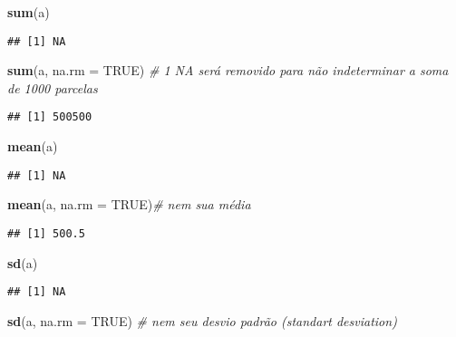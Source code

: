 \documentclass[]{article}
\newenvironment{Shaded}{\begin{snugshade}}{\end{snugshade}}
\newcommand{\KeywordTok}[1]{\textcolor[rgb]{0.13,0.29,0.53}{\textbf{#1}}}
\newcommand{\DataTypeTok}[1]{\textcolor[rgb]{0.13,0.29,0.53}{#1}}
\newcommand{\CommentTok}[1]{\textcolor[rgb]{0.56,0.35,0.01}{\textit{#1}}}
\newcommand{\OtherTok}[1]{\textcolor[rgb]{0.56,0.35,0.01}{#1}}
\newcommand{\NormalTok}[1]{#1}
\begin{document}
\begin{Shaded}
\begin{Highlighting}[]
\KeywordTok{sum}\NormalTok{(a)}
\end{Highlighting}
\end{Shaded}

\begin{verbatim}
## [1] NA
\end{verbatim}

\begin{Shaded}
\begin{Highlighting}[]
\KeywordTok{sum}\NormalTok{(a, }\DataTypeTok{na.rm =} \OtherTok{TRUE}\NormalTok{) }\CommentTok{# 1 NA será removido para não indeterminar a soma de 1000 parcelas}
\end{Highlighting}
\end{Shaded}

\begin{verbatim}
## [1] 500500
\end{verbatim}

\begin{Shaded}
\begin{Highlighting}[]
\KeywordTok{mean}\NormalTok{(a)}
\end{Highlighting}
\end{Shaded}

\begin{verbatim}
## [1] NA
\end{verbatim}

\begin{Shaded}
\begin{Highlighting}[]
\KeywordTok{mean}\NormalTok{(a, }\DataTypeTok{na.rm =} \OtherTok{TRUE}\NormalTok{)}\CommentTok{# nem sua média}
\end{Highlighting}
\end{Shaded}

\begin{verbatim}
## [1] 500.5
\end{verbatim}

\begin{Shaded}
\begin{Highlighting}[]
\KeywordTok{sd}\NormalTok{(a)}
\end{Highlighting}
\end{Shaded}

\begin{verbatim}
## [1] NA
\end{verbatim}

\begin{Shaded}
\begin{Highlighting}[]
\KeywordTok{sd}\NormalTok{(a, }\DataTypeTok{na.rm =} \OtherTok{TRUE}\NormalTok{)  }\CommentTok{# nem seu desvio padrão (standart desviation)}
\end{Highlighting}
\end{Shaded}
\end{document}
